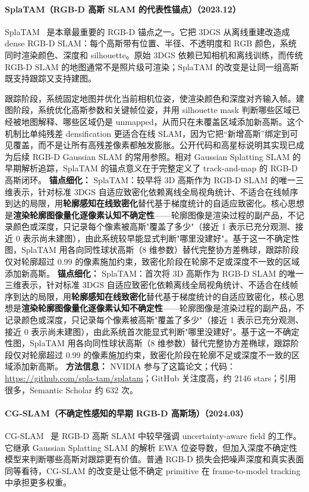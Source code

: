 \paragraph{SplaTAM（RGB-D 高斯 SLAM 的代表性锚点）（2023.12）}
SplaTAM~\cite{2312_02126} 是本章最重要的 RGB-D 锚点之一。它把 3DGS 从离线重建改造成 dense RGB-D SLAM：每个高斯带有位置、半径、不透明度和 RGB 颜色，系统同时渲染颜色、深度和 silhouette。原始 3DGS 依赖已知相机和离线训练，而传统 RGB-D SLAM 的地图通常不是照片级可渲染；SplaTAM 的改变是让同一组高斯既支持跟踪又支持建图。

跟踪阶段，系统固定地图并优化当前相机位姿，使渲染颜色和深度对齐输入帧。建图阶段，系统优化高斯参数和关键帧位姿，并用 silhouette mask 判断哪些区域已经被地图解释、哪些区域仍是 unmapped，从而只在未覆盖区域添加新高斯。这个机制比单纯残差 densification 更适合在线 SLAM，因为它把“新增高斯”绑定到可见覆盖，而不是让所有高残差像素都触发膨胀。公开代码和高星标说明其实现已成为后续 RGB-D Gaussian SLAM 的常用参照。相对 Gaussian Splatting SLAM 的早期解析追踪，SplaTAM 的锚点意义在于完整定义了 track-and-map 的 RGB-D 高斯闭环。
\textbf{锚点细化：} SplaTAM：较早将 3D 高斯作为 RGB-D SLAM 的唯一三维表示，针对标准 3DGS 自适应致密化依赖离线全局视角统计、不适合在线帧序到达的局限，用\textbf{轮廓感知在线致密化}替代基于梯度统计的自适应致密化。核心思想是\textbf{渲染轮廓图像量化逐像素认知不确定性}——轮廓图像是渲染过程的副产品，不记录颜色或深度，只记录每个像素被高斯"覆盖了多少"（接近 1 表示已充分观测、接近 0 表示尚未建图），由此系统较早能显式判断"哪里没建好"。基于这一不确定性图，SplaTAM 用各向同性球状高斯（8 维参数）替代完整协方差椭球，跟踪阶段仅对轮廓超过 0.99 的像素施加约束，致密化阶段在轮廓不足或深度不一致的区域添加新高斯。
\textbf{锚点细化：} SplaTAM：首次将 3D 高斯作为 RGB-D SLAM 的唯一三维表示，针对标准 3DGS 自适应致密化依赖离线全局视角统计、不适合在线帧序到达的局限，用\textbf{轮廓感知在线致密化}替代基于梯度统计的自适应致密化，核心思想是\textbf{渲染轮廓图像量化逐像素认知不确定性}——轮廓图像是渲染过程的副产品，不记录颜色或深度，只记录每个像素被高斯"覆盖了多少"（接近 1 表示已充分观测、接近 0 表示尚未建图），由此系统首次能显式判断"哪里没建好"。基于这一不确定性图，SplaTAM 用各向同性球状高斯（8 维参数）替代完整协方差椭球，跟踪阶段仅对轮廓超过 0.99 的像素施加约束，致密化阶段在轮廓不足或深度不一致的区域添加新高斯。
\textbf{方法信息：} NVIDIA 参与了这篇论文；代码：\url{https://github.com/spla-tam/splatam}；GitHub 关注度高，约 2146 stars；引用很多，Semantic Scholar 约 632 次。



\paragraph{CG-SLAM（不确定性感知的早期 RGB-D 高斯场）（2024.03）}
CG-SLAM~\cite{2403_16095} 是 RGB-D 高斯 SLAM 中较早强调 uncertainty-aware field 的工作。它继承 Gaussian Splatting SLAM 的解析 EWA 位姿导数，但加入深度不确定性模型来判断哪些高斯对跟踪更有价值。普通 RGB-D 损失会把噪声深度和真实表面同等看待，CG-SLAM 的改变是让低不确定 primitive 在 frame-to-model tracking 中承担更多权重。

